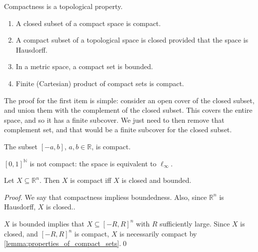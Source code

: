\documentclass[notoc,notitlepage]{tufte-book}
\begin{document}
\begin{note}
  Compactness is a topological property.
\end{note}

\begin{lemma}\label{lemma:properties_of_compact_sets}
  \begin{enumerate}
    \item A closed subset of a compact space is compact.
    \item A compact subset of a topological space is closed provided that the
      space is Hausdorff.
    \item In a metric space, a compact set is bounded.
    \item Finite (Cartesian) product of compact sets is compact.
  \end{enumerate}
\end{lemma}

The proof for the first item is simple: consider an open cover of the closed subset,
and union them with the complement of the closed subset. This covers the entire space,
and so it has a finite subcover. We just need to then remove that complement set, and
that would be a finite subcover for the closed subset.

\begin{eg}
  The subset $[-a, b]$, $a, b \in \mathbb{R}$, is compact.
\end{eg}

\begin{eg}
  $[0, 1]^{\mathbb{N}}$ is not compact: the space is equivalent to $\ell_\infty$.
\end{eg}

\begin{thm}\label{thm:heine_borel}
  Let $X \subseteq \mathbb{R}^n$. Then $X$ is compact iff $X$ is closed and bounded.
\end{thm}

\begin{proof}
  \hlbnoted{$(\implies)$} We say that compactness impliess boundedness. Also, since 
  $\mathbb{R}^n$ is Hausdorff, $X$ is closed..

  \noindent
  \hlbnoted{$(\impliedby)$} $X$ is bounded implies that $X \subseteq [-R, R]^n$ with $R$
  sufficiently large. Since $X$ is closed, and $[-R, R]^n$ is compact, $X$ is necessarily
  compact by \cref{lemma:properties_of_compact_sets}.\qed\
\end{proof}
\end{document}
